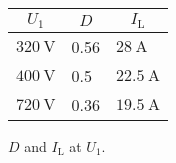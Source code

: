 \begin{solutiontable}[htb]
    \centering  %
    \begin{tabular}{lll}
        \toprule
        \multicolumn{1}{c}{$U_\mathrm{1}$} & \multicolumn{1}{c}{$D$} & \multicolumn{1}{c}{$I_\mathrm{L}$} \\
        \midrule         
        $\SI{320}{\volt}$ & 0.56 & $\SI{28}{\ampere}$ \\ 
        $\SI{400}{\volt}$ & 0.5 & $\SI{22.5}{\ampere}$ \\ 
        $\SI{720}{\volt}$ & 0.36 & $\SI{19.5}{\ampere}$ \\ 
        \bottomrule
    \end{tabular}
    \caption{$D$ and $I_\mathrm{L}$ at $U_\mathrm{1}$.}
    \label{table:InductorCurrentDutyCycle}
\end{solutiontable}

